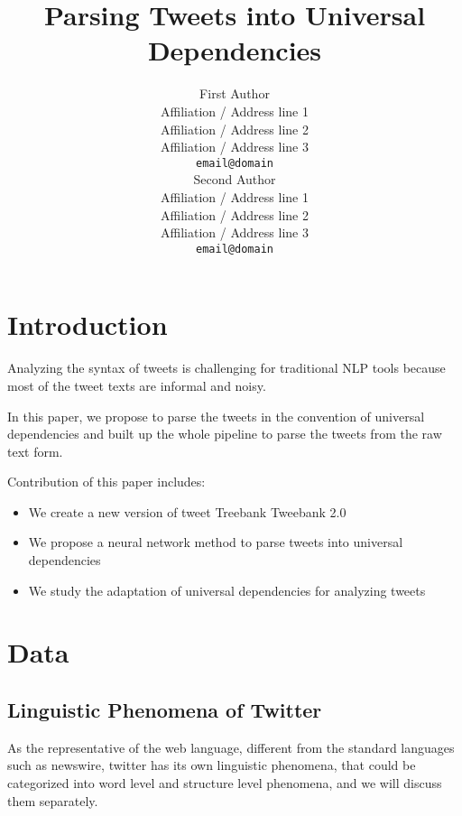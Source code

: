 \documentclass[11pt,letterpaper]{article}
\title{Parsing Tweets into Universal Dependencies}
\author{First Author \\
  Affiliation / Address line 1 \\
  Affiliation / Address line 2 \\
  Affiliation / Address line 3 \\
  {\tt email@domain} \\\And
  Second Author \\
  Affiliation / Address line 1 \\
  Affiliation / Address line 2 \\
  Affiliation / Address line 3 \\
  {\tt email@domain} \\}
\date{}
\begin{document}
\maketitle
\begin{abstract}

\end{abstract}




\section{Introduction}
Analyzing the syntax of tweets is challenging for traditional NLP tools because most of the tweet texts are informal and noisy.

In this paper, we propose to parse the tweets in the convention of universal dependencies and built up the whole pipeline to parse the tweets from the raw text form.

Contribution of this paper includes:
\begin{itemize}
\item We create a new version of tweet Treebank Tweebank 2.0
\item We propose a neural network method to parse tweets into universal dependencies
\item We study the adaptation of universal dependencies for analyzing tweets
\end{itemize}



\section{Data}

\subsection{Linguistic Phenomena of Twitter} \label{introduction}
As the representative of the web language, different from the standard languages such as newswire, twitter has its own linguistic phenomena, that could be categorized into word level and structure level phenomena, and we will discuss them separately.
\end{document}
